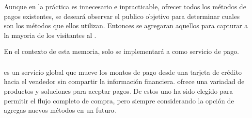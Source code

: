 	Aunque en la práctica es innecesario e inpracticable, ofrecer todos los métodos de pagos existentes, se deseará observar el publico objetivo para determinar cuales son los métodos que ellos utilizan. Entonces se agregaran aquellos para capturar a la mayoria de los visitantes al \websiteINT \cite{online_kissmetrics_easy_payment_process}.

	En el contexto de esta memoria, solo se implementará a \paypalNAME como servicio de pago.
	
	\subsubsection{\paypalNAME}

		\paypalNAME es un servicio global que mueve los montos de pago desde una tarjeta de crédito hacia el vendedor sin compartir la información financiera. \paypalNAME ofrece una variadad de productos y soluciones para aceptar pagos. De estos uno ha sido elegído para permitir el flujo completo de compra, pero siempre considerando la opción de agregas nuevos métodos en un futuro.



